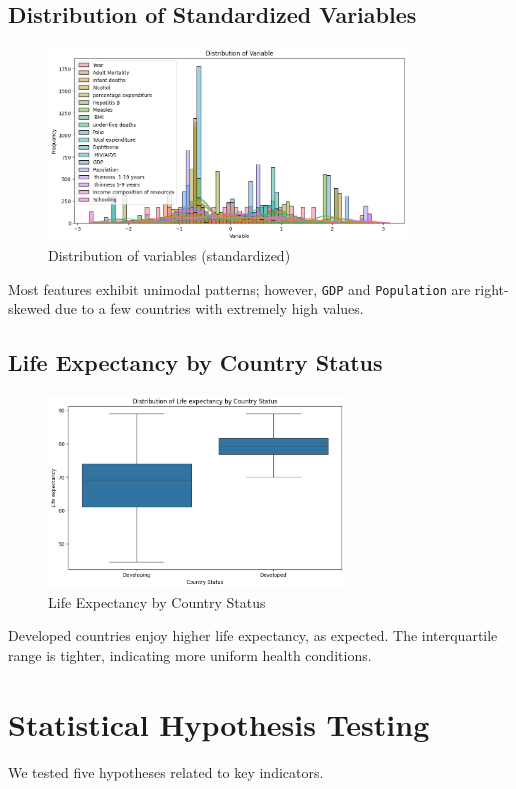 \documentclass[11pt]{article}
\begin{document}
\subsection{Distribution of Standardized Variables}
\begin{figure}[H]
    \centering
    \includegraphics[width=0.85\textwidth]{output2.png}
    \caption{Distribution of variables (standardized)}
\end{figure}
Most features exhibit unimodal patterns; however, \texttt{GDP} and \texttt{Population} are right-skewed due to a few countries with extremely high values.

\subsection{Life Expectancy by Country Status}
\begin{figure}[H]
    \centering
    \includegraphics[width=0.7\textwidth]{output3.png}
    \caption{Life Expectancy by Country Status}
\end{figure}
Developed countries enjoy higher life expectancy, as expected. The interquartile range is tighter, indicating more uniform health conditions.

\section{Statistical Hypothesis Testing}
We tested five hypotheses related to key indicators.
\end{document}
